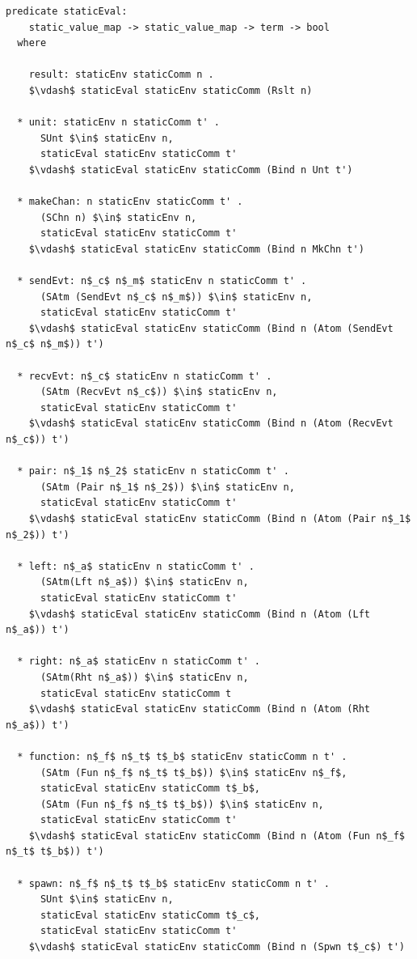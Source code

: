 \documentclass[letterpaper, 11pt]{extarticle}
\begin{document}
\begin{lstlisting}[language=logic, mathescape]
  predicate staticEval:
    static_value_map -> static_value_map -> term -> bool
  where

    result: staticEnv staticComm n .
    $\vdash$ staticEval staticEnv staticComm (Rslt n)

  * unit: staticEnv n staticComm t' .
      SUnt $\in$ staticEnv n,
      staticEval staticEnv staticComm t'
    $\vdash$ staticEval staticEnv staticComm (Bind n Unt t')

  * makeChan: n staticEnv staticComm t' .
      (SChn n) $\in$ staticEnv n,
      staticEval staticEnv staticComm t'
    $\vdash$ staticEval staticEnv staticComm (Bind n MkChn t')

  * sendEvt: n$_c$ n$_m$ staticEnv n staticComm t' .
      (SAtm (SendEvt n$_c$ n$_m$)) $\in$ staticEnv n,
      staticEval staticEnv staticComm t' 
    $\vdash$ staticEval staticEnv staticComm (Bind n (Atom (SendEvt n$_c$ n$_m$)) t')

  * recvEvt: n$_c$ staticEnv n staticComm t' . 
      (SAtm (RecvEvt n$_c$)) $\in$ staticEnv n,
      staticEval staticEnv staticComm t'
    $\vdash$ staticEval staticEnv staticComm (Bind n (Atom (RecvEvt n$_c$)) t')

  * pair: n$_1$ n$_2$ staticEnv n staticComm t' .
      (SAtm (Pair n$_1$ n$_2$)) $\in$ staticEnv n,
      staticEval staticEnv staticComm t'
    $\vdash$ staticEval staticEnv staticComm (Bind n (Atom (Pair n$_1$ n$_2$)) t')

  * left: n$_a$ staticEnv n staticComm t' .
      (SAtm(Lft n$_a$)) $\in$ staticEnv n,
      staticEval staticEnv staticComm t' 
    $\vdash$ staticEval staticEnv staticComm (Bind n (Atom (Lft n$_a$)) t')

  * right: n$_a$ staticEnv n staticComm t' .
      (SAtm(Rht n$_a$)) $\in$ staticEnv n, 
      staticEval staticEnv staticComm t
    $\vdash$ staticEval staticEnv staticComm (Bind n (Atom (Rht n$_a$)) t')

  * function: n$_f$ n$_t$ t$_b$ staticEnv staticComm n t' .
      (SAtm (Fun n$_f$ n$_t$ t$_b$)) $\in$ staticEnv n$_f$, 
      staticEval staticEnv staticComm t$_b$, 
      (SAtm (Fun n$_f$ n$_t$ t$_b$)) $\in$ staticEnv n, 
      staticEval staticEnv staticComm t'
    $\vdash$ staticEval staticEnv staticComm (Bind n (Atom (Fun n$_f$ n$_t$ t$_b$)) t')

  * spawn: n$_f$ n$_t$ t$_b$ staticEnv staticComm n t' .
      SUnt $\in$ staticEnv n, 
      staticEval staticEnv staticComm t$_c$, 
      staticEval staticEnv staticComm t'
    $\vdash$ staticEval staticEnv staticComm (Bind n (Spwn t$_c$) t')


\end{lstlisting}
\end{document}
